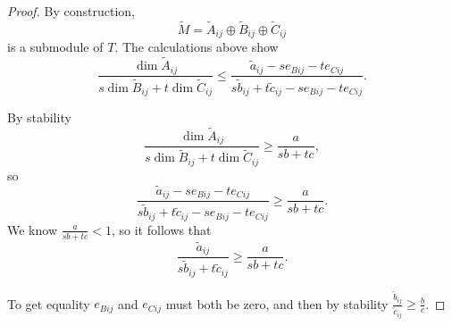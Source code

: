 \documentclass[10pt,a4paper]{amsart}
\begin{document}
\begin{proof}
By construction, 
$$\tilde M= \tilde A_{ij} \oplus \tilde B_{ij} \oplus \tilde C_{ij}$$
is a submodule of $T$. The calculations above show
\begin{equation} \label{eq:nd}
\frac{\dim \tilde A_{ij}}{s \dim \tilde B_{ij}+t \dim \tilde C_{ij}} \leq  \frac{\tilde a_{ij} - se_{Bij} - te_{Cij}}{s\tilde b_{ij} +t\tilde c_{ij}  -s e_{Bij} - te_{Cij}}. 
\end{equation}

By stability
\begin{equation} 
\frac{\dim \tilde A_{ij}}{s \dim \tilde B_{ij}+t \dim \tilde C_{ij}} \geq \frac{a}{sb+tc},
\end{equation}
so
\begin{equation} 
\frac{\tilde a_{ij} - se_{Bij} - te_{Cij}}{s\tilde b_{ij} +t\tilde c_{ij}  -s e_{Bij} - te_{Cij}} \geq \frac{a}{sb+tc}.
\end{equation}
We know $\frac{a}{sb+tc}<1$, so it follows that 
$$
\frac{\tilde a_{ij} }{s\tilde b_{ij} +t\tilde c_{ij}  } \geq \frac{a}{sb+tc}.
$$

To get equality $e_{Bij}$ and $e_{Cij}$ must both be zero, and then by stability $\frac{\tilde b_{ij}}{\tilde c_{ij}} \geq \frac{b}{c}$.
\end{proof}
\end{document}
